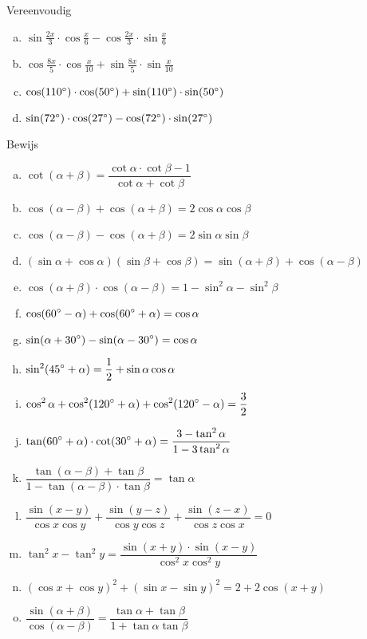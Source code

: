 \documentclass[twoside,a4paper,12pt]{article}
\begin{document}
\begin{oefening}
Vereenvoudig
\begin{enumerate}[(a)]
  \itemsep.5em
  \item $\sin\frac{2x}{3}\cdot \cos\frac{x}{6}-\cos\frac{2x}{3}\cdot \sin\frac{x}{6}$
  \item $\cos\frac{8x}{5}\cdot \cos\frac{x}{10}+\sin\frac{8x}{5}\cdot \sin\frac{x}{10}$
  \item $\cos(110^\circ)\cdot \cos(50^\circ)+\sin(110^\circ)\cdot \sin(50^\circ)$
  \item $\sin(72^\circ)\cdot \cos(27^\circ)-\cos(72^\circ)\cdot \sin(27^\circ)$
\end{enumerate}
\end{oefening}

\begin{oefening} %
Bewijs
\begin{enumerate}[(a)]
  \itemsep.6em
  \item $\displaystyle \cot(\alpha+\beta)=\dfrac{\cot\alpha\cdot\cot\beta-1}{\cot\alpha+\cot\beta}$
  \item $\displaystyle \cos(\alpha-\beta)+\cos(\alpha+\beta)=2\cos\alpha\cos\beta$
  \item $\displaystyle \cos(\alpha-\beta)-\cos(\alpha+\beta)=2\sin\alpha\sin\beta$
  \item $\displaystyle (\sin\alpha + \cos\alpha)(\sin\beta + \cos\beta)=\sin(\alpha+\beta) + \cos(\alpha-\beta)$
  \item $\displaystyle \cos(\alpha + \beta)\cdot\cos(\alpha - \beta) = 1 - \sin^2\alpha - \sin^2\beta$
  \item $\displaystyle \cos(60^\circ - \alpha) + \cos(60^\circ + \alpha) = \cos\alpha$
  \item $\displaystyle \sin(\alpha + 30^\circ) - \sin(\alpha - 30^\circ)=\cos\alpha$
  \item $\displaystyle \sin^2(45^\circ + \alpha) = \dfrac{1}{2} + \sin\alpha\cos\alpha$
  \item $\displaystyle \cos^2\alpha + \cos^2(120^\circ + \alpha)+\cos^2(120^\circ - \alpha)=\dfrac{3}{2}$
  \item $\displaystyle \tan(60^\circ + \alpha)\cdot\cot(30^\circ + \alpha) = \dfrac{3 - \tan^2\alpha}{1-3\tan^2\alpha}$
  \item $\displaystyle \dfrac{\tan(\alpha-\beta) + \tan\beta}{1 - \tan(\alpha - \beta)\cdot\tan\beta} = \tan\alpha$
  \item $\displaystyle \dfrac{\sin(x-y)}{\cos x \cos y} + \dfrac{\sin(y-z)}{\cos y \cos z} + \dfrac{\sin(z-x)}{\cos z \cos x} = 0$
  \item $\displaystyle \tan^2 x - \tan^2 y = \dfrac{\sin(x+y)\cdot\sin(x-y)}{\cos^2 x \cos^2 y}$
  \item $\displaystyle (\cos x + \cos y)^2 + (\sin x - \sin y)^2 = 2 + 2\cos(x+y)$
  \item $\displaystyle \dfrac{\sin(\alpha + \beta)}{\cos(\alpha - \beta)} = \dfrac{\tan \alpha + \tan \beta}{1 + \tan\alpha \tan\beta}$
\end{enumerate}
\end{oefening}
\end{document}
